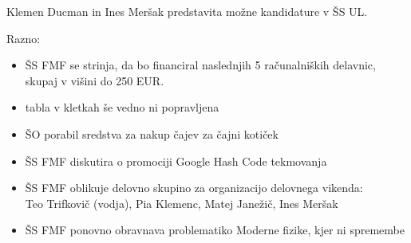 \documentclass{seja}
\begin{document}
\begin{ad}
	\item 
	Klemen Ducman in Ines Meršak predstavita možne kandidature v ŠS UL.
	
	\item
	Razno:
		\begin{itemize}
			\item
				\begin{sklep}
				    ŠS FMF se strinja, da bo financiral naslednjih 5 računalniških delavnic, skupaj v višini do 250 EUR.
				\end{sklep}	
			\item
			tabla v kletkah še vedno ni popravljena
			\item 
			ŠO porabil sredstva za nakup čajev za čajni kotiček
			\item 
			ŠS FMF diskutira o promociji Google Hash Code tekmovanja
			\item 
			ŠS FMF oblikuje delovno skupino za organizacijo delovnega vikenda: \\
			Teo Trifkovič (vodja), Pia Klemenc, Matej Janežič, Ines Meršak
			\item 
			ŠS FMF ponovno obravnava problematiko Moderne fizike, kjer ni spremembe
		\end{itemize} 	
	
\end{ad}
\end{document}
